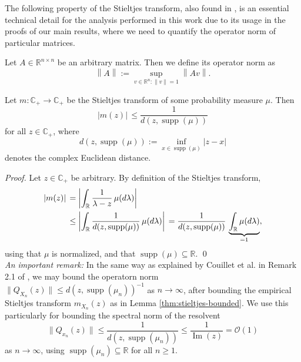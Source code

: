 \documentclass{article}
\begin{document}
\bigskip
\par
The following property of the Stieltjes transform, also found in \cite{hachem}, is an essential technical detail for the analysis performed in this work due to its usage in the proofs of our main results, where we need to quantify the operator norm of particular matrices.
\bigskip
\begin{definition}
Let $A\in\mathbb{R}^{n\times n}$ be an arbitrary matrix. Then we define its operator norm as
$$\left\|A\right\|:=\sup_{v\in\mathbb{R}^n:\left\|v\right\|=1}\left\|Av\right\|.$$
\end{definition}
\bigskip
\begin{lemma}
Let $m:\mathbb{C}_+\to\mathbb{C}_+$ be the Stieltjes transform of some probability measure $\mu$. Then
$$|m(z)|\,\leq\frac{1}{d(z,\operatorname{supp}(\mu))}$$
for all $z\in\mathbb{C}_+$, where
$$d(z,\operatorname{supp}(\mu)):=\inf\limits_{x\in\operatorname{supp}(\mu)}|z-x|$$
denotes the complex Euclidean distance.\label{thm:stieltjes-bounded}
\end{lemma}
\bigskip
\noindent
\emph{Proof.} Let $z\in\mathbb{C}_+$ be arbitrary. By definition of the Stieltjes transform,
\begin{align}
|m(z)|\,&=\left|\int_{\mathbb{R}}\frac{1}{\lambda-z}\,\mu(d\lambda)\right| \notag
\\ &\leq\left|\int_{\mathbb{R}}\frac{1}{d(z,\operatorname{supp}(\mu))}\,\mu(d\lambda)\right|\,=\frac{1}{d(z,\operatorname{supp}(\mu))}\,\underbrace{\int_{\mathbb{R}}\mu(d\lambda)}_{=1},
\end{align}
using that $\mu$ is normalized, and that $\operatorname{supp}(\mu)\subseteq\mathbb{R}$.
\qed
\bigskip
\\
\emph{An important remark:} In the same way as explained by Couillet et al. in Remark 2.1 of \cite{couillet}, we may bound the operatorn norm $\|Q_{X_n}(z)\|\leq d(z,\operatorname{supp}(\mu_n))^{-1}$ as $n\to\infty$, after bounding the empirical Stieltjes transform $m_{X_n}(z)$ as in Lemma \ref{thm:stieltjes-bounded}. We use this particularly for bounding the spectral norm of the resolvent
\begin{equation}
\|Q_{x_n}(z)\|\leq \frac{1}{d(z,\operatorname{supp}(\mu_n))}\leq\frac{1}{\operatorname{Im}(z)}=\mathcal{O}(1) \label{eq:important-remark}
\end{equation}
as $n\to\infty$, using $\operatorname{supp}(\mu_n)\subseteq\mathbb{R}$ for all $n\geq1$.
\end{document}
